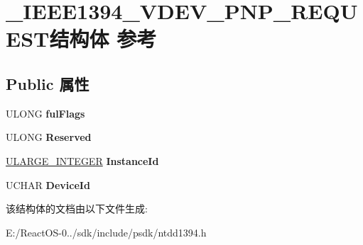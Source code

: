 \hypertarget{struct___i_e_e_e1394___v_d_e_v___p_n_p___r_e_q_u_e_s_t}{}\section{\+\_\+\+I\+E\+E\+E1394\+\_\+\+V\+D\+E\+V\+\_\+\+P\+N\+P\+\_\+\+R\+E\+Q\+U\+E\+S\+T结构体 参考}
\label{struct___i_e_e_e1394___v_d_e_v___p_n_p___r_e_q_u_e_s_t}
\subsection*{Public 属性}
\begin{DoxyCompactItemize}
\item 
\mbox{\label{struct___i_e_e_e1394___v_d_e_v___p_n_p___r_e_q_u_e_s_t_ad05c559fed8d44d77c2c77784e8e6f2d}} 
U\+L\+O\+NG {\bfseries ful\+Flags}
\item 
\mbox{\label{struct___i_e_e_e1394___v_d_e_v___p_n_p___r_e_q_u_e_s_t_a79ea7b80aceb58c7fdfec2a3f1840378}} 
U\+L\+O\+NG {\bfseries Reserved}
\item 
\mbox{\label{struct___i_e_e_e1394___v_d_e_v___p_n_p___r_e_q_u_e_s_t_a5d051e606cb2f0c3be9acea1936975b6}} 
\hyperlink{struct___u_l_a_r_g_e___i_n_t_e_g_e_r}{U\+L\+A\+R\+G\+E\+\_\+\+I\+N\+T\+E\+G\+ER} {\bfseries Instance\+Id}
\item 
\mbox{\label{struct___i_e_e_e1394___v_d_e_v___p_n_p___r_e_q_u_e_s_t_a4e37699fc98bb37949c16d7b8389a84e}} 
U\+C\+H\+AR {\bfseries Device\+Id}
\end{DoxyCompactItemize}


该结构体的文档由以下文件生成\+:\begin{DoxyCompactItemize}
\item 
E\+:/\+React\+O\+S-\/0../sdk/include/psdk/ntdd1394.\+h\end{DoxyCompactItemize}
